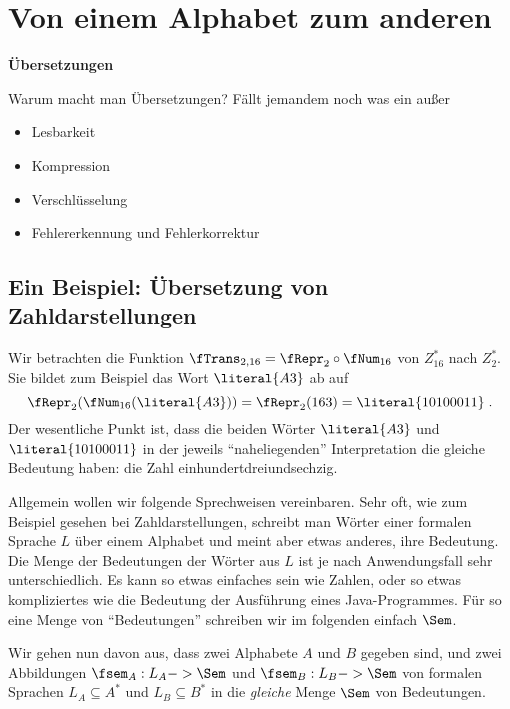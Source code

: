 \Tut\section{Von einem Alphabet zum anderen}

\begin{tutorium}
  \noindent\textbf{Übersetzungen}

    Warum macht man Übersetzungen? Fällt jemandem noch was ein außer
  \begin{itemize}
  \item Lesbarkeit
  \item Kompression
  \item Verschlüsselung
  \item Fehlererkennung und Fehlerkorrektur
  \end{itemize}
\end{tutorium}
\Tut\subsection{Ein Beispiel: \"Ubersetzung von Zahldarstellungen}

Wir betrachten die Funktion $\fTrans_{2,16}=\fRepr_2 \circ \fNum_{16}$
von $Z_{16}^*$ nach $Z_2^*$. Sie bildet zum Beispiel das Wort
$\literal{A3}$ ab auf
\[
\fRepr_2 ( \fNum_{16}(\literal{A3})) = \fRepr_2(163)=
\literal{10100011} \;.
\]
Der wesentliche Punkt ist, dass die beiden Wörter $\literal{A3}$
und $\literal{10100011}$
in der jeweils "`naheliegenden"' Interpretation die gleiche Bedeutung
haben: die Zahl einhundertdreiundsechzig.

Allgemein wollen wir folgende Sprechweisen vereinbaren. 
%
Sehr oft, wie zum Beispiel gesehen bei Zahldarstellungen, schreibt man
Wörter einer formalen Sprache $L$
über einem Alphabet und meint aber etwas anderes, ihre Bedeutung. 
%
Die Menge der Bedeutungen der Wörter aus $L$
ist je nach Anwendungsfall sehr unterschiedlich. 
%
Es kann so etwas einfaches sein wie Zahlen, oder so etwas
kompliziertes wie die Bedeutung der Ausführung eines Java-Programmes.
%
Für so eine Menge von "`Bedeutungen"' schreiben wir im folgenden
einfach $\Sem$.

Wir gehen nun davon aus, dass zwei Alphabete $A$ und $B$ gegeben sind,
und zwei Abbildungen $\fsem_A:L_A-> \Sem$ und $\fsem_B:L_B-> \Sem$ von
formalen Sprachen $L_A\subseteq A^*$ und $L_B\subseteq B^*$ in die
\emph{gleiche} Menge $\Sem$ von Bedeutungen.

